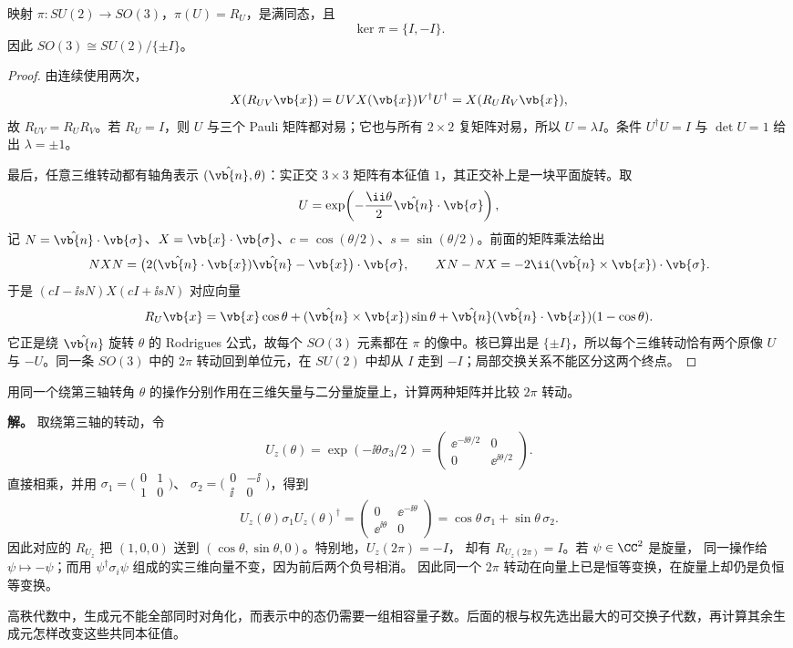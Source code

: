 \begin{theorem}[$SU(2)$ 到 $SO(3)$ 的二重覆盖]
映射 $\pi:SU(2)\to SO(3)$，$\pi(U)=R_U$，是满同态，且
\[
\ker\pi=\{I,-I\}.
\]
因此 $SO(3)\cong SU(2)/\{\pm I\}$。
\end{theorem}

\begin{proof}
由连续使用两次，
\[
X(R_{UV}\vb{x})
=UVX(\vb{x})V^\dagger U^\dagger
=X(R_U R_V\vb{x}),
\]
故 $R_{UV}=R_UR_V$。若 $R_U=I$，则 $U$ 与三个 Pauli 矩阵都对易；它也与所有 $2\times2$ 复矩阵对易，所以 $U=\lambda I$。条件 $U^\dagger U=I$ 与 $\det U=1$ 给出 $\lambda=\pm1$。

最后，任意三维转动都有轴角表示 $(\hat{\vb{n}},\theta)$：实正交 $3\times3$ 矩阵有本征值 $1$，其正交补上是一块平面旋转。取
\[
U=\exp\!\left(-\frac{\ii\theta}{2}
\hat{\vb{n}}\cdot\vb{\sigma}\right),
\]
记 $N=\hat{\vb{n}}\cdot\vb{\sigma}$、$X=\vb{x}\cdot\vb{\sigma}$、$c=\cos(\theta/2)$、$s=\sin(\theta/2)$。前面的矩阵乘法给出
\[
NXN=\bigl(2(\hat{\vb{n}}\cdot\vb{x})\hat{\vb{n}}-\vb{x}\bigr)\cdot\vb{\sigma},
\qquad XN-NX=-2\ii(\hat{\vb{n}}\times\vb{x})\cdot\vb{\sigma}.
\]
于是 $(cI-\ii sN)X(cI+\ii sN)$ 对应向量
\[
R_U\vb{x}
=\vb{x}\cos\theta
+(\hat{\vb{n}}\times\vb{x})\sin\theta
+\hat{\vb{n}}(\hat{\vb{n}}\cdot\vb{x})(1-\cos\theta).
\]
它正是绕 $\hat{\vb{n}}$ 旋转 $\theta$ 的 Rodrigues 公式，故每个 $SO(3)$ 元素都在 $\pi$ 的像中。核已算出是 $\{\pm I\}$，所以每个三维转动恰有两个原像 $U$ 与 $-U$。同一条 $SO(3)$ 中的 $2\pi$ 转动回到单位元，在 $SU(2)$ 中却从 $I$ 走到 $-I$；局部交换关系不能区分这两个终点。
\end{proof}

\begin{example}[同一次转动对向量与旋量的作用]
用同一个绕第三轴转角 $\theta$ 的操作分别作用在三维矢量与二分量旋量上，计算两种矩阵并比较 $2\pi$ 转动。

\textbf{解。} 取绕第三轴的转动，令
\[
U_z(\theta)=\exp(-\ii\theta\sigma_3/2)
=\begin{pmatrix}\ee^{-\ii\theta/2}&0\\0&\ee^{\ii\theta/2}\end{pmatrix}.
\]
直接相乘，并用
$\sigma_1=\bigl(\begin{smallmatrix}0&1\\1&0\end{smallmatrix}\bigr)$、
$\sigma_2=\bigl(\begin{smallmatrix}0&-\ii\\\ii&0\end{smallmatrix}\bigr)$，得到
\[
U_z(\theta)\sigma_1U_z(\theta)^\dagger
=\begin{pmatrix}0&\ee^{-\ii\theta}\\\ee^{\ii\theta}&0\end{pmatrix}
=\cos\theta\,\sigma_1+\sin\theta\,\sigma_2.
\]
因此对应的 $R_{U_z}$ 把 $(1,0,0)$ 送到
$(\cos\theta,\sin\theta,0)$。特别地，$U_z(2\pi)=-I$，
却有 $R_{U_z(2\pi)}=I$。若 $\psi\in\CC^2$ 是旋量，
同一操作给 $\psi\mapsto-\psi$；而用
$\psi^\dagger\sigma_i\psi$ 组成的实三维向量不变，因为前后两个负号相消。
因此同一个 $2\pi$ 转动在向量上已是恒等变换，在旋量上却仍是负恒等变换。
\end{example}



高秩代数中，生成元不能全部同时对角化，而表示中的态仍需要一组相容量子数。后面的根与权先选出最大的可交换子代数，再计算其余生成元怎样改变这些共同本征值。
